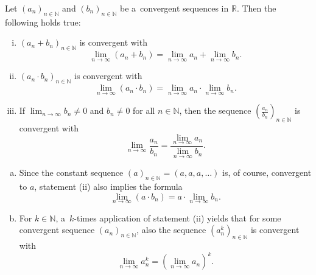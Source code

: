 

\begin{Theorem}
\label{thm:limformnormed}
  Let $(a_n)_{n\in\mathbb{N}}$ and $(b_n)_{n\in\mathbb{N}}$ be a~convergent sequences in $\mathbb{R}$. Then the following holds true:
\begin{enumerate}[(i)]
  \item $(a_n+b_n)_{n\in\mathbb{N}}$ is convergent with \[\lim_{n\to\infty}(a_n+b_n)= \lim_{n\to\infty}a_n+\lim_{n\to\infty}b_n.\]
  \item $( a_n\cdot b_n)_{n\in\mathbb{N}}$ is convergent with \[\lim_{n\to\infty}(a_n\cdot b_n)= \lim_{n\to\infty}a_n\cdot\lim_{n\to\infty}b_n.\]
  \item If $\lim_{n\to\infty}b_n\neq0$ and $b_n\neq0$ for all $n\in\mathbb{N}$, then the sequence $(\frac{a_n}{b_n})_{n\in\mathbb{N}}$ is convergent with \[\lim_{n\to\infty}\frac{a_n}{b_n}=\frac{\displaystyle\lim_{n\to\infty}a_n}{\displaystyle\lim_{n\to\infty}b_n}.\]
\end{enumerate}
\end{Theorem}

\begin{Remark}{}
\label{rem:seqpot}
\begin{enumerate}[(a)]
\item
 Since the constant sequence $(a)_{n\in\mathbb{N}}=(a,a,a,\ldots)$ is, of course, convergent to $a$, statement (ii) also implies the formula
\[\lim_{n\to\infty} ( a\cdot b_n ) = a\cdot\lim_{n\to\infty}b_n.\]
\item
 For $k\in\mathbb{N}$, a~$k$-times application of statement (ii) yields that for some convergent sequence $(a_n)_{n\in\mathbb{N}}$, also the sequence $(a_n^k)_{n\in\mathbb{N}}$ is convergent with
\[\lim_{n\to\infty}a_n^k=\left(\lim_{n\to\infty}a_n\right)^k.\]
\end{enumerate}
\end{Remark}
